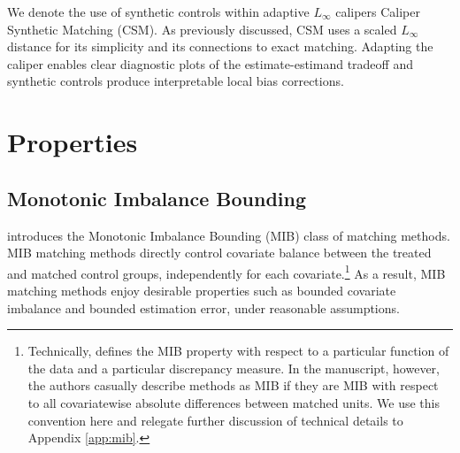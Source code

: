 \documentclass{article}
\begin{document}
We denote the use of synthetic controls within adaptive $L_\infty$ calipers Caliper Synthetic Matching (CSM).
As previously discussed, CSM uses a scaled $L_\infty$ distance for its simplicity and its connections to exact matching.
Adapting the caliper enables clear diagnostic plots of the estimate-estimand tradeoff and synthetic controls produce interpretable local bias corrections.

\section{Properties}
\label{sec:properties}
\subsection{Monotonic Imbalance Bounding}
\label{sec:mib}

\citet{iacus2011multivariate} introduces the Monotonic Imbalance Bounding (MIB) class of matching methods.
MIB matching methods directly control covariate balance between the treated and matched control groups, independently for each covariate.\footnote{Technically, \cite{iacus2011multivariate} defines the MIB property with respect to a particular function of the data and a particular discrepancy measure.
In the manuscript, however, the authors casually describe methods as MIB if they are MIB with respect to all covariatewise absolute differences between matched units.
We use this convention here and relegate further discussion of technical details to Appendix \ref{app:mib}.}
As a result, MIB matching methods enjoy desirable properties such as bounded covariate imbalance and bounded estimation error, under reasonable assumptions.
\end{document}
